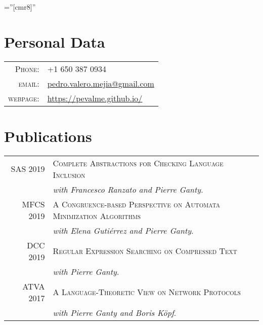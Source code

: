 \documentclass[a4paper,10pt]{article} %
\begin{document}
\pagestyle{empty} %

\font\fb=''[cmr8]'' %


\par{\bigskip\par} %

\section{Personal Data}

\begin{tabular}{rl}
\textsc{Phone:} & +1 650 387 0934\\
\textsc{email:} & \href{mailto:pedro.valero.mejia@gmail.com}{pedro.valero.mejia@gmail.com} \\
\textsc{webpage:} & \href{https://pevalme.github.io/}{https://pevalme.github.io/}\\
\end{tabular}


\section{Publications}
\begin{tabular}{rl}
\textsc{SAS} 2019 & \textsc{Complete Abstractions for Checking Language Inclusion} \\
& \textit{with Francesco Ranzato and Pierre Ganty}. \\
\textsc{MFCS} 2019 & \textsc{A Congruence-based Perspective on Automata Minimization Algorithms} \\
 & \textit{with Elena Gutiérrez and Pierre Ganty}. \\
\textsc{DCC} 2019 & \textsc{Regular Expression Searching on Compressed Text} \\
 & \textit{with Pierre Ganty}. \\
\textsc{ATVA} 2017 & \textsc{A Language-Theoretic View on Network Protocols} \\
& \textit{with Pierre Ganty and Boris Köpf}. \\
\end{tabular}
\end{document}
